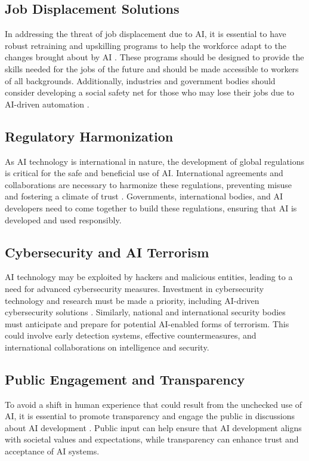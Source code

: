 \documentclass[man]{apa7}
\begin{document}
\subsection{Job Displacement Solutions}
In addressing the threat of job displacement due to AI, it is essential to have robust retraining and upskilling programs to help the workforce adapt to the changes brought about by AI \parencite{arntz2016}. These programs should be designed to provide the skills needed for the jobs of the future and should be made accessible to workers of all backgrounds. Additionally, industries and government bodies should consider developing a social safety net for those who may lose their jobs due to AI-driven automation \parencite{chui2018}. 

\subsection{Regulatory Harmonization}
As AI technology is international in nature, the development of global regulations is critical for the safe and beneficial use of AI. International agreements and collaborations are necessary to harmonize these regulations, preventing misuse and fostering a climate of trust \parencite{schneider2020}. Governments, international bodies, and AI developers need to come together to build these regulations, ensuring that AI is developed and used responsibly.

\subsection{Cybersecurity and AI Terrorism}
AI technology may be exploited by hackers and malicious entities, leading to a need for advanced cybersecurity measures. Investment in cybersecurity technology and research must be made a priority, including AI-driven cybersecurity solutions \parencite{brundage2020}. Similarly, national and international security bodies must anticipate and prepare for potential AI-enabled forms of terrorism. This could involve early detection systems, effective countermeasures, and international collaborations on intelligence and security.

\subsection{Public Engagement and Transparency}
To avoid a shift in human experience that could result from the unchecked use of AI, it is essential to promote transparency and engage the public in discussions about AI development \parencite{bietti2020}. Public input can help ensure that AI development aligns with societal values and expectations, while transparency can enhance trust and acceptance of AI systems.
\end{document}
